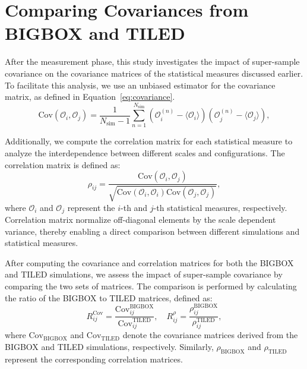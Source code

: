 \section{Comparing Covariances from BIGBOX and TILED}
After the measurement phase, this study investigates the impact of super-sample covariance on the covariance matrices of the statistical measures discussed earlier. To facilitate this analysis, we use an unbiased estimator for the covariance matrix, as defined in Equation~\ref{eq:covariance}.
\begin{equation}
    \label{eq:covariance}
    \mathrm{Cov}(\mathcal{O}_i, \mathcal{O}_j) = \frac{1}{N_{\mathrm{sim}} - 1} \sum_{n=1}^{N_{\mathrm{sim}}} (\mathcal{O}_i^{(n)} - \langle \mathcal{O}_i \rangle) (\mathcal{O}_j^{(n)} - \langle \mathcal{O}_j \rangle),
\end{equation}

Additionally, we compute the correlation matrix for each statistical measure to analyze the interdependence between different scales and configurations. The correlation matrix is defined as:
\begin{equation}
    \rho_{ij} = \frac{\text{Cov}(\mathcal{O}_i, \mathcal{O}_j)}{\sqrt{\text{Cov}(\mathcal{O}_i, \mathcal{O}_i)\text{Cov}(\mathcal{O}_j, \mathcal{O}_j)}},
\end{equation}
where $\mathcal{O}_i$ and $\mathcal{O}_j$ represent the $i$-th and $j$-th statistical measures, respectively. Correlation matrix normalize off-diagonal elements by the scale dependent variance, thereby enabling a direct comparison between different simulations and statistical measures.

After computing the covariance and correlation matrices for both the BIGBOX and TILED simulations, we assess the impact of super-sample covariance by comparing the two sets of matrices. The comparison is performed by calculating the ratio of the BIGBOX to TILED matrices, defined as:
\begin{equation}
    R^{\mathrm{Cov}}_{ij} = \frac{\mathrm{Cov}^{\mathrm{BIGBOX}}_{ij}}{\mathrm{Cov}^{\mathrm{TILED}}_{ij}}, \quad R^{\rho}_{ij} = \frac{\rho^{\mathrm{BIGBOX}}_{ij}}{\rho^{\mathrm{TILED}}_{ij}},
\end{equation}
where $\mathrm{Cov}_{\mathrm{BIGBOX}}$ and $\mathrm{Cov}_{\mathrm{TILED}}$ denote the covariance matrices derived from the BIGBOX and TILED simulations, respectively. Similarly, $\rho_{\mathrm{BIGBOX}}$ and $\rho_{\mathrm{TILED}}$ represent the corresponding correlation matrices.

